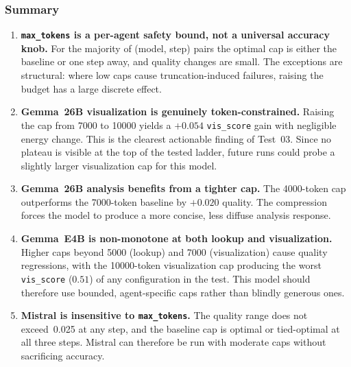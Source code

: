 \subsubsection{Summary}

\begin{enumerate}
    \item \textbf{\texttt{max\_tokens} is a per-agent safety bound,
          not a universal accuracy knob.} For the majority of
          (model, step) pairs the optimal cap is either the baseline or
          one step away, and quality changes are small. The exceptions
          are structural: where low caps cause truncation-induced
          failures, raising the budget has a large discrete effect.

    \item \textbf{Gemma~26B visualization is genuinely token-constrained.}
          Raising the cap from 7000 to 10000 yields a $+0.054$
          \texttt{vis\_score} gain with negligible energy change. This
          is the clearest actionable finding of Test~03. Since no plateau
          is visible at the top of the tested ladder, future runs could
          probe a slightly larger visualization cap for this model.

    \item \textbf{Gemma~26B analysis benefits from a tighter cap.}
          The 4000-token cap outperforms the 7000-token baseline by
          $+0.020$ quality. The compression forces the model to
          produce a more concise, less diffuse analysis response.

    \item \textbf{Gemma~E4B is non-monotone at both lookup and visualization.}
          Higher caps beyond 5000 (lookup) and 7000 (visualization)
          cause quality regressions, with the 10000-token visualization
          cap producing the worst \texttt{vis\_score} ($0.51$) of any
          configuration in the test. This model should therefore use
          bounded, agent-specific caps rather than blindly generous ones.

    \item \textbf{Mistral is insensitive to \texttt{max\_tokens}.}
          The quality range does not exceed~0.025 at any step, and the
          baseline cap is optimal or tied-optimal at all three steps.
          Mistral can therefore be run with moderate caps without sacrificing
          accuracy.
\end{enumerate}

